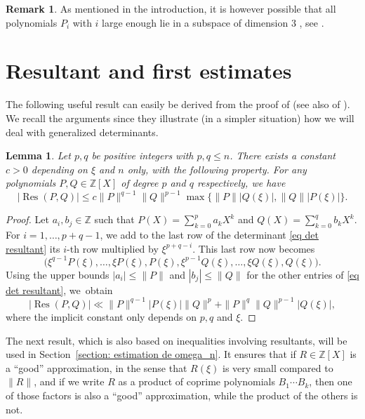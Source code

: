 \documentclass[JEP,XML,SOM,Unicode,NoFloatCountersInSection,published]{cedram}
\DeclareMathOperator\Res{Res}
\newcommand\bZ{\mathbb{Z}}
\newcommand{\normH}[1]{\|#1\|}
\theoremstyle{definition}
\newtheorem{Rem}[Def]{Remark}
\theoremstyle{plain}
\newtheorem{Lem}[Def]{Lemma}
\begin{document}
\begin{Rem}
As mentioned in the introduction, it is however possible that all polynomials $P_i$ with $i$ large enough lie in a subspace of dimension $3$ , see \cite[Th.\,1.3]{moshchevitin2007best}.
\end{Rem}

\section{Resultant and first estimates}
\label{section: resultant et premier resultat}

The following useful result can easily be derived from the proof of \cite[\S 5]{davenport1969approximation} (see also of \cite[Lem.\,1]{brownawell1974sequences}). We recall the arguments since they illustrate (in a simpler situation) how we will deal with generalized determinants.

\begin{Lem}
\label{lem: estimation classique du resultant}
Let $p,q$ be positive integers with $p,q\leq n$. There exists a constant $c>0$ depending on $\xi$ and $n$ only, with the following property. For any polynomials $P,Q\in\bZ[X]$ of degree $p$ and $q$ respectively, we have
\begin{equation*}
|\Res(P,Q)| \leq c \normH{P}^{q-1}\normH{Q}^{p-1} \max\big\{\normH{P}|Q(\xi)|, \normH{Q}|P(\xi)| \big\}.
\end{equation*}
\end{Lem}

\begin{proof}
Let $a_i,b_j\in \bZ$ such that $P(X) = \sum_{k=0}^{p} a_kX^k$ and $Q(X) = \sum_{k=0}^{q} b_kX^k$. For $i=1,\dots,p+q-1$, we add to the last row of the determinant \eqref{eq det resultant} its $i$-th row multiplied by $\xi^{p+q-i}$. This last row now becomes
\begin{equation*}
\Big(\xi^{q-1}P(\xi), \dots, \xi P(\xi), P(\xi), \xi^{p-1}Q(\xi), \dots, \xi Q(\xi), Q(\xi)\Big).
\end{equation*}
Using the upper bounds $|a_i| \leq \normH{P}$ and $|b_j|\leq \normH{Q}$ for the other entries of \eqref{eq det resultant}, we~obtain
\begin{equation*}
|\Res(P,Q)| \ll \normH{P}^{q-1}|P(\xi)| \normH{Q}^p + \normH{P}^q\normH{Q}^{p-1}|Q(\xi)|,
\end{equation*}
where the implicit constant only depends on $p, q$ and $\xi$.
\end{proof}

The next result, which is also based on inequalities involving resultants, will be used in Section~\ref{section: estimation de omega_n}. It ensures that if $R\in\bZ[X]$ is a ``good'' approximation, in the sense that $R(\xi)$ is very small compared to $\normH{R}$, and if we write $R$ as a product of coprime polynomials $B_1\cdots B_k$, then one of those factors is also a ``good'' approximation, while the product of the others is not.
\end{document}
